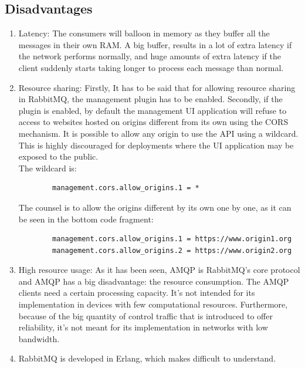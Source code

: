 \documentclass[12pt]{article}
\begin{document}
\subsection*{Disadvantages}
\begin{enumerate}
    \item Latency: The consumers will balloon in memory as they buffer all the messages in their own RAM. A big buffer, results in a lot of extra latency if the network performs normally, and huge amounts of extra latency if the client suddenly starts taking longer to process each message than normal.
    \item Resource sharing: Firstly, It has to be said that for allowing resource sharing in RabbitMQ, the management plugin has to be enabled. Secondly, if the plugin is enabled, by default the management UI application will refuse to access to websites hosted on origins different from its own using the CORS mechanism. It is possible to allow any origin to use the API using a wildcard. This is highly discouraged for deployments where the UI application may be exposed to the public.\\
    The wildcard is:\\
    \begin{lstlisting}
        management.cors.allow_origins.1 = *
    \end{lstlisting}
    The counsel is to allow the origins different by its own one by one, as it can be seen in the bottom code fragment:
    \begin{lstlisting}
        management.cors.allow_origins.1 = https://www.origin1.org
        management.cors.allow_origins.2 = https://www.origin2.org
    \end{lstlisting}
    \item High resource usage: As it has been seen, AMQP is RabbitMQ's core protocol and AMQP has a big disadvantage: the resource consumption. The AMQP clients need a certain processing capacity. It's not intended for its implementation in devices with few computational resources. Furthermore, because of the big quantity of control traffic that is introduced to offer reliability, it's not meant for its implementation in networks with low bandwidth.
    \item RabbitMQ is developed in Erlang, which makes difficult to understand.
\end{enumerate}
\end{document}
